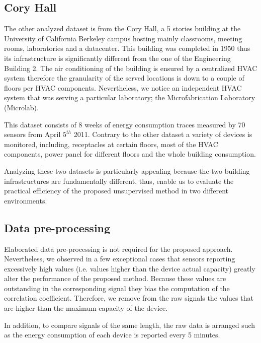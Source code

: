 \subsection{Cory Hall}
The other analyzed dataset is from the Cory Hall, a 5 stories building at the University of California Berkeley campus hosting mainly classrooms, meeting rooms, laboratories and a datacenter.
This building was completed in 1950 thus its infrastructure is significantly different from the one of the Engineering Building 2.
The air conditioning of the building is ensured by a centralized HVAC system therefore the granularity of the served locations is down to a couple of floors per HVAC components.
Nevertheless, we notice an independent HVAC system that was serving a particular laboratory; the Microfabrication Laboratory (Microlab).

This dataset consists of 8 weeks of energy consumption traces measured by 70 sensors from April $5^{th}$ 2011.
Contrary to the other dataset a variety of devices is monitored, including,	 receptacles at certain floors, most of the HVAC components, power panel for different floors and the whole building consumption.

Analyzing these two datasets is particularly appealing because the two building infrastructures are fundamentally different, thus, enable us to evaluate the practical efficiency of the proposed unsupervised method in two different environments.


\subsection{Data pre-processing}
Elaborated data pre-processing is not required for the proposed approach.
Nevertheless, we observed in a few exceptional cases that sensors reporting excessively high values (i.e. values higher than the device actual capacity) greatly alter the performance of the proposed method.
Because these values are outstanding in the corresponding signal they bias the computation of the correlation coefficient.
Therefore, we remove from the raw signals the values that are higher than the maximum capacity of the device.

In addition, to compare signals of the same length, the raw data is arranged such as the energy consumption of each device is reported every 5 minutes. 

